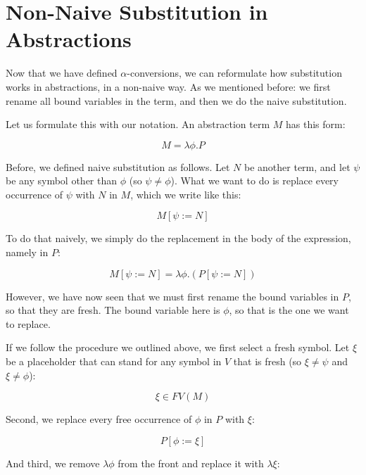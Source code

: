 \documentclass{book}
\numberwithin{equation}{chapter}
\begin{document}
\chapter{Non-Naive Substitution in Abstractions}

Now that we have defined $\alpha$-conversions, we can reformulate how substitution works in abstractions, in a non-naive way. As we mentioned before: we first rename all bound variables in the term, and then we do the naive substitution.

Let us formulate this with our notation. An abstraction term $M$ has this form:

\begin{equation}
M = \lambda \phi.P
\end{equation}

\noindent
Before, we defined naive substitution as follows. Let $N$ be another term, and let $\psi$ be any symbol other than $\phi$ (so $\psi \not = \phi$). What we want to do is replace every occurrence of $\psi$ with $N$ in $M$, which we write like this:

\begin{equation}
M[\psi := N]
\end{equation}

\noindent
To do that naively, we simply do the replacement in the body of the expression, namely in $P$:

\begin{equation}
M[\psi := N] = \lambda \phi.(P[\psi := N])
\end{equation}

\noindent
However, we have now seen that we must first rename the bound variables in $P$, so that they are fresh. The bound variable here is $\phi$, so that is the one we want to replace. 

If we follow the procedure we outlined above, we first select a fresh symbol. Let $\xi$ be a placeholder that can stand for any symbol in $V$ that is fresh (so $\xi \not = \psi$ and $\xi \not = \phi$):

\begin{equation}
\xi \in FV(M)
\end{equation}

\noindent
Second, we replace every free occurrence of $\phi$ in $P$ with $\xi$:

\begin{equation}
P[\phi := \xi]
\end{equation}

\noindent
And third, we remove $\lambda \phi$ from the front and replace it with $\lambda \xi$:
\end{document}
